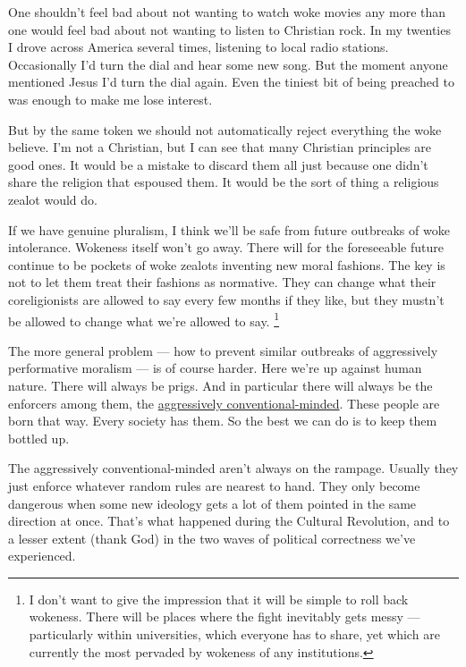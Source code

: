 One shouldn't feel bad about not wanting to watch woke movies any more
than one would feel bad about not wanting to listen to Christian rock.
In my twenties I drove across America several times, listening to local
radio stations. Occasionally I'd turn the dial and hear some new song.
But the moment anyone mentioned Jesus I'd turn the dial again. Even the
tiniest bit of being preached to was enough to make me lose interest.

But by the same token we should not automatically reject everything the
woke believe. I'm not a Christian, but I can see that many Christian
principles are good ones. It would be a mistake to discard them all just
because one didn't share the religion that espoused them. It would be
the sort of thing a religious zealot would do.

If we have genuine pluralism, I think we'll be safe from future
outbreaks of woke intolerance. Wokeness itself won't go away. There will
for the foreseeable future continue to be pockets of woke zealots
inventing new moral fashions. The key is not to let them treat their
fashions as normative. They can change what their coreligionists are
allowed to say every few months if they like, but they mustn't be
allowed to change what we're allowed to say. \footnote{I don't want to give the impression that it will be simple to
roll back wokeness. There will be places where the fight inevitably gets
messy --- particularly within universities, which everyone has to share,
yet which are currently the most pervaded by wokeness of any
institutions.}

The more general problem --- how to prevent similar outbreaks of
aggressively performative moralism --- is of course harder. Here we're
up against human nature. There will always be prigs. And in particular
there will always be the enforcers among them, the
\href{conformism.html}{aggressively conventional-minded}. These people
are born that way. Every society has them. So the best we can do is to
keep them bottled up.

The aggressively conventional-minded aren't always on the rampage.
Usually they just enforce whatever random rules are nearest to hand.
They only become dangerous when some new ideology gets a lot of them
pointed in the same direction at once. That's what happened during the
Cultural Revolution, and to a lesser extent (thank God) in the two waves
of political correctness we've experienced.


